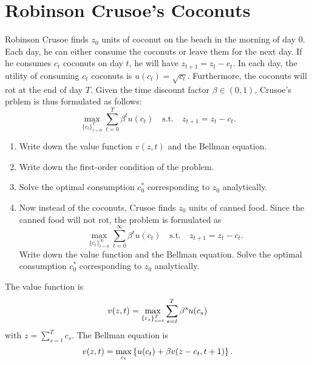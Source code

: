 \documentclass[12pt]{article}
\begin{document}
\section{Robinson Crusoe's Coconuts}
Robinson Crusoe finds $z_0$ units of coconut on the beach in 
the morning of day $0$. Each day, he can either consume the 
coconuts or leave them for the next day. If he consumes $c_t$ 
coconuts on day $t$, he will have $z_{t+1} = z_t - c_t$. In 
each day, the utility of consuming $c_t$ coconuts is $u(c_t) = 
\sqrt{c_t}$. Furthermore, the coconuts will rot at the end of 
day $T$. Given the time discount factor $\beta\in(0,1)$, 
Crusoe's prblem is thus formulated as follows: 
\begin{equation*}
    \max_{\{c_t\}_{t=0}^T} \sum_{t=0}^T \beta^t u(c_t) 
    \quad \text{s.t.} \quad z_{t+1} = z_t - c_t. 
\end{equation*}
\begin{enumerate}
    \item Write down the value function $v(z, t)$ and the 
    Bellman equation. 
    \item Write down the first-order condition of the problem. 
    \item Solve the optimal consumption $c^*_0$ corresponding 
    to $z_0$ analytically. 
    \item Now instead of the coconuts, Crusoe finds $z_0$ units 
    of canned food. Since the canned food will not rot, the 
    problem is formulated as 
    \begin{equation*}
        \max_{\{c_t\}_{t=0}^\infty} \sum_{t=0}^\infty \beta^t u(c_t) 
        \quad \text{s.t.} \quad z_{t+1} = z_t - c_t.
    \end{equation*}
    Write down the value function and the Bellman equation. 
    Solve the optimal consumption $c^*_0$ corresponding to 
    $z_0$ analytically.
\end{enumerate}

\begin{sol}[3.1]
    The value function is 
    \begin{equation*}
        v(z, t) = \max_{\left\{ {c_s} \right\}_{s=t}^T} \sum_{s=t}^T \beta^s u(c_s) 
    \end{equation*}
    with $z = \sum_{s=t}^{T}c_s$. The Bellman equation is 
    \begin{equation*}
        v(z, t) = \max_{c_{t}} \left\{ {u(c_t) + \beta v(z-c_t, t+1)} \right\}.
    \end{equation*}
    \solend
\end{sol}
\end{document}
